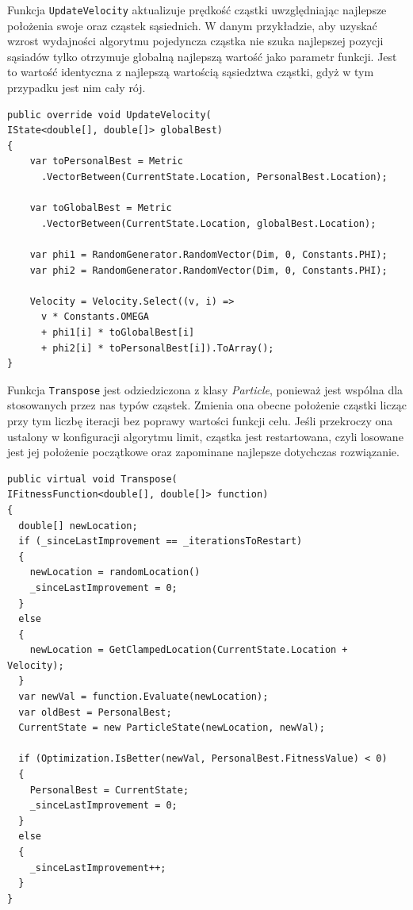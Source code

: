 \documentclass[12pt, twoside, openany, abstract=on]{report}
\theoremstyle{definition}
\begin{document}
Funkcja \texttt{UpdateVelocity} aktualizuje prędkość cząstki uwzględniając najlepsze położenia swoje oraz cząstek sąsiednich. W danym przykładzie, aby uzyskać wzrost wydajności algorytmu pojedyncza cząstka nie szuka najlepszej pozycji sąsiadów tylko otrzymuje globalną najlepszą wartość jako parametr funkcji. Jest to wartość identyczna z najlepszą wartością sąsiedztwa cząstki, gdyż w tym przypadku jest nim cały rój.

\lstset{style=sharpc}
\begin{lstlisting}[frame=single]
public override void UpdateVelocity(
IState<double[], double[]> globalBest)
{
    var toPersonalBest = Metric
      .VectorBetween(CurrentState.Location, PersonalBest.Location);
            
    var toGlobalBest = Metric
      .VectorBetween(CurrentState.Location, globalBest.Location);

    var phi1 = RandomGenerator.RandomVector(Dim, 0, Constants.PHI);
    var phi2 = RandomGenerator.RandomVector(Dim, 0, Constants.PHI);

    Velocity = Velocity.Select((v, i) => 
      v * Constants.OMEGA 
      + phi1[i] * toGlobalBest[i] 
      + phi2[i] * toPersonalBest[i]).ToArray();
}

\end{lstlisting}

Funkcja \texttt{Transpose} jest odziedziczona z klasy \textit{Particle}, ponieważ jest wspólna dla stosowanych przez nas typów cząstek. Zmienia ona obecne położenie cząstki licząc przy tym liczbę iteracji bez poprawy wartości funkcji celu. Jeśli przekroczy ona ustalony w konfiguracji algorytmu limit, cząstka jest restartowana, czyli losowane jest jej położenie początkowe oraz zapominane najlepsze dotychczas rozwiązanie.

\lstset{style=sharpc}
\begin{lstlisting}[frame=single]
public virtual void Transpose(
IFitnessFunction<double[], double[]> function)
{
  double[] newLocation;
  if (_sinceLastImprovement == _iterationsToRestart)
  {
    newLocation = randomLocation()
    _sinceLastImprovement = 0;
  }
  else
  {
    newLocation = GetClampedLocation(CurrentState.Location + Velocity);
  }
  var newVal = function.Evaluate(newLocation);
  var oldBest = PersonalBest;
  CurrentState = new ParticleState(newLocation, newVal);

  if (Optimization.IsBetter(newVal, PersonalBest.FitnessValue) < 0)
  {
    PersonalBest = CurrentState;
    _sinceLastImprovement = 0;
  }
  else
  {
    _sinceLastImprovement++;
  }
}
\end{lstlisting}
\end{document}
